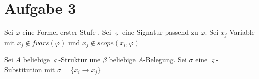 \section*{Aufgabe 3}



Sei $\varphi$ eine Formel erster Stufe . Sei $\varsigma$ eine Signatur passend zu $\varphi$. Sei $x_j$ Variable mit $x_j \notin fvars(\varphi)$ und $x_j \notin scope(x_i, \varphi)$

Sei $A$ beliebige $\varsigma$-Struktur une $\beta$ beliebige $A$-Belegung. Sei $\sigma$ eine $\varsigma$-Substitution mit $\sigma=\{x_i \rightarrow x_j\}$